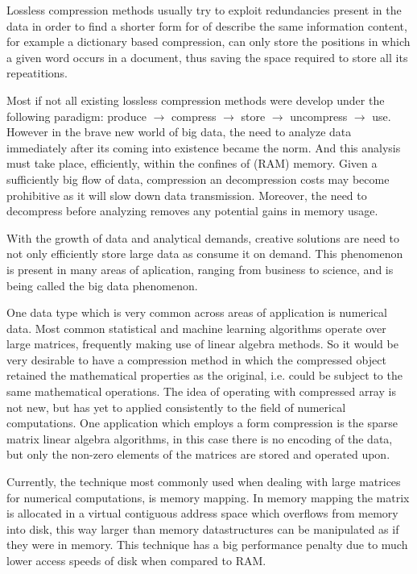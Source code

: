 \documentclass[10pt]{article}
\begin{document}
Lossless compression methods usually try to exploit redundancies present in the data in order to find a shorter form for of describe the same information content, for example a dictionary based compression, can only store the positions in which a given word occurs in a document, thus saving the space required to store all its repeatitions\cite{salomon2}. 

Most if not all existing lossless compression methods were develop under the following paradigm: produce $\rightarrow$ compress $\rightarrow$ store $\rightarrow$ uncompress $\rightarrow$ use. However in the brave new world of big data, the need to analyze data immediately after its coming into existence became the norm. And this analysis must take place, efficiently, within the confines of (RAM) memory. Given a sufficiently big flow of data, compression an decompression costs may become prohibitive as it will slow down data transmission. Moreover, the need to decompress before analyzing removes any potential gains in memory usage.

With the growth of data and analytical demands, creative solutions are need to not only efficiently store large data as consume it on demand. This phenomenon is present in many areas of aplication, ranging from business to science\cite{lynch}, and is being called the big data phenomenon. 

One data type which is very common across areas of application is numerical data. Most common statistical and machine learning algorithms operate over large matrices, frequently making use of linear algebra methods. So it would be very desirable to have a compression method in which the compressed object retained the mathematical properties as the original, i.e. could be subject to the same mathematical operations. The idea of operating with compressed array is not new\cite{yemliha2007compiler}, but has yet to applied consistently to the field of numerical computations. One application which employs a form compression is the sparse matrix linear algebra algorithms\cite{dodson1991sparse}, in this case there is no encoding of the data, but only the non-zero elements of the matrices are stored and operated upon. 

Currently, the technique most commonly used when dealing with large matrices for numerical computations, is memory mapping\cite{van2011numpy,big}. In memory mapping the matrix is allocated in a virtual contiguous address space which overflows from memory into disk, this way larger than memory datastructures can be manipulated as if they were in memory.  This technique has a big performance penalty due to much lower access speeds of disk when compared to RAM. 
\end{document}
